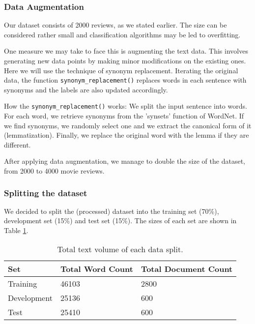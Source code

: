 \documentclass[10pt, a4paper]{article}
\begin{document}
        \subsubsection{Data Augmentation}
        Our dataset consists of 2000 reviews, as we stated earlier. The size can be considered rather small and classification algorithms may be led to overfitting. 
        
        One measure we may take to face this is augmenting the text data. This involves generating new data points by making minor modifications on the existing ones. Here we will use the technique of synonym replacement. Iterating the original data, the function \texttt{synonym\_replacement()} replaces words in each sentence with synonyms and the labels are also updated accordingly.
        
        How the \texttt{synonym\_replacement()} works: We split the input sentence into words. For each word, we retrieve synonyms from the 'synsets' function of WordNet. If we find synonyms, we randomly select one and we extract the canonical form of it (lemmatization). Finally, we replace the original word with the lemma if they are different.

        After applying data augmentation, we manage to double the size of the dataset, from 2000 to 4000 movie reviews. 

        
	
	\subsubsection{Splitting the dataset}
	We decided to split the (processed) dataset into the training set (70\%), development set (15\%) and test set (15\%). The sizes of each set are shown in Table \ref{tab::ex-9-stats}.
	
	\begin{table}
		\begin{tabular}{|l|l|l|}
			\hline
			\cellcolor{blue!25}\textbf{Set} & \cellcolor{blue!25}\textbf{Total Word Count} &
			\cellcolor{blue!25}\textbf{Total Document Count}\\
			\hline
			Training & 46103 & 2800 \\\hline
			Development & 25136  & 600 \\\hline
			Test & 25410 & 600 \\\hline
		\end{tabular}
		\centering
		\caption{Total text volume of each data split.}
		\label{tab::ex-9-stats}
	\end{table}
	
\end{document}
